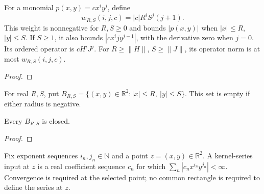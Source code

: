 \begin{supporting}
\begin{theorem}
\label{thm:volterra-series-terms}
\leanok
For a monomial $p(x,y)=cx^iy^j$, define
\[
 w_{R,S}(i,j,c)=|c|R^iS^j(j+1).
\]
This weight is nonnegative for $R,S\ge0$ and bounds $|p(x,y)|$ when
$|x|\le R$, $|y|\le S$. If $S\ge1$, it also bounds
$|cx^i j y^{j-1}|$, with the derivative zero when $j=0$.
Its ordered operator is $cH^iJ^j$. For
$R\ge\|H\|$, $S\ge\|J\|$, its operator norm is at most $w_{R,S}(i,j,c)$.
\end{theorem}
\begin{proof}
\leanok
\end{proof}

\begin{definition}
\label{def:volterra-series-box}
\leanok
For real $R,S$, put
$B_{R,S}=\{(x,y)\in\mathbb R^2:|x|\le R,\ |y|\le S\}$.
This set is empty if either radius is negative.
\end{definition}

\begin{theorem}
\label{thm:volterra-series-box}
\leanok
Every $B_{R,S}$ is closed.
\end{theorem}
\begin{proof}
\leanok
\end{proof}

\begin{definition}
\label{def:volterra-series-kernel-input}
\leanok
Fix exponent sequences $i_n,j_n\in\mathbb N$ and a point $z=(x,y)\in\mathbb R^2$.
A kernel-series input at $z$ is a real coefficient sequence $c_n$ for which
$\sum_n |c_nx^{i_n}y^{j_n}|<\infty$.
Convergence is required at the selected point; no common rectangle is required
to define the series at $z$.
\end{definition}


\end{supporting}
